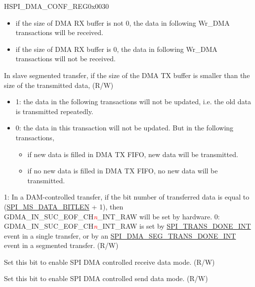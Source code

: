 \begin{register}{H}{SPI\_DMA\_CONF\_REG}{0x0030}
\begin{regdesc}
\begin{reglist}
\begin{itemize}
    \item if the size of DMA RX buffer is not 0, the data in following Wr\_DMA transactions will be received.
    \item if the size of DMA RX buffer is 0, the data in following Wr\_DMA transactions will not be received.
\end{itemize}
\label{fielddesc:SPISLVTXSEGTRANSCLREN}\item [SPI\_SLV\_TX\_SEG\_TRANS\_CLR\_EN] In slave segmented transfer, if the size of the DMA TX buffer is smaller than the size of the transmitted data, (R/W)
\begin{itemize}
    \item 1: the data in the following transactions will not be updated, i.e. the old data is transmitted repeatedly.
    \item 0: the data in this transaction will not be updated. But in the following transactions,
    \begin{itemize}
        \item if new data is filled in DMA TX FIFO, new data will be transmitted.
        \item if no new data is filled in DMA TX FIFO, no new data will be transmitted.

    \end{itemize}
    \end{itemize}
\label{fielddesc:SPIRXEOFEN}\item [SPI\_RX\_EOF\_EN] 1: In a DAM-controlled transfer, if the bit number of
transferred data is equal to (\hyperref[fielddesc:SPIMSDATABITLEN]{SPI\_MS\_DATA\_BITLEN} + 1), then GDMA\_IN\_SUC\_EOF\_CH\textcolor{red}{\it{n}}\_INT\_RAW will be set by hardware. 0: GDMA\_IN\_SUC\_EOF\_CH\textcolor{red}{\it{n}}\_INT\_RAW is set by \hyperref[int:SPITRANSDONEINT]{SPI\_TRANS\_DONE\_INT} event in a single transfer, or by an \hyperref[int:SPIDMASEGTRANSDONEINT]{SPI\_DMA\_SEG\_TRANS\_DONE\_INT} event in a segmented transfer. (R/W)
\label{fielddesc:SPIDMARXENA}\item [SPI\_DMA\_RX\_ENA] Set this bit to enable SPI DMA controlled receive data mode. (R/W)
\label{fielddesc:SPIDMATXENA}\item [SPI\_DMA\_TX\_ENA] Set this bit to enable SPI DMA controlled send data mode. (R/W)

\item [Continued on the next page...]
\end{reglist}\end{regdesc}
\end{register}

